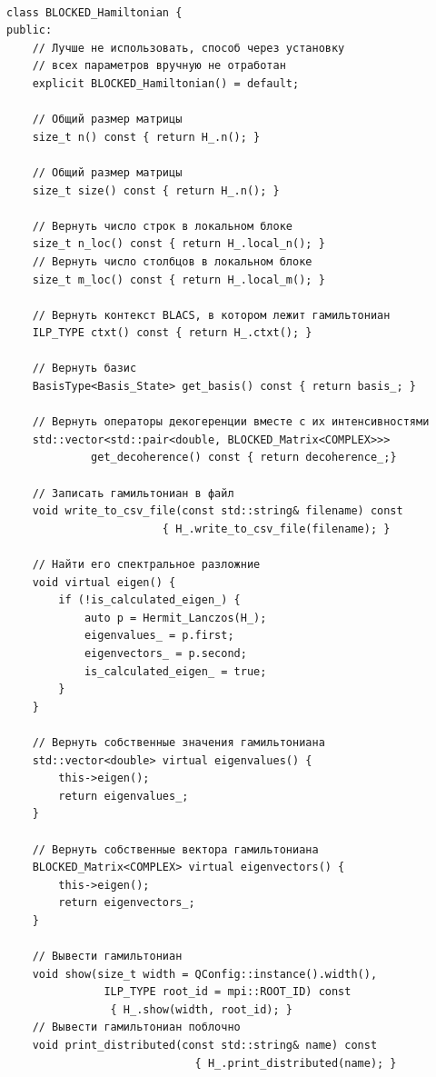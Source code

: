 \documentclass[12pt,fleqn]{article}
\begin{document}
\begin{mdframed}[linecolor=black, topline=true, bottomline=true,
    leftline=false, rightline=false]
\begin{verbatim}

class BLOCKED_Hamiltonian {
public:
    // Лучше не использовать, способ через установку
    // всех параметров вручную не отработан
    explicit BLOCKED_Hamiltonian() = default;

    // Общий размер матрицы
    size_t n() const { return H_.n(); }

    // Общий размер матрицы
    size_t size() const { return H_.n(); }

    // Вернуть число строк в локальном блоке
    size_t n_loc() const { return H_.local_n(); }
    // Вернуть число столбцов в локальном блоке
    size_t m_loc() const { return H_.local_m(); }

    // Вернуть контекст BLACS, в котором лежит гамильтониан
    ILP_TYPE ctxt() const { return H_.ctxt(); }

    // Вернуть базис
    BasisType<Basis_State> get_basis() const { return basis_; }

    // Вернуть операторы декогеренции вместе с их интенсивностями
    std::vector<std::pair<double, BLOCKED_Matrix<COMPLEX>>>
             get_decoherence() const { return decoherence_;}

    // Записать гамильтониан в файл
    void write_to_csv_file(const std::string& filename) const
                        { H_.write_to_csv_file(filename); }

    // Найти его спектральное разложние
    void virtual eigen() {
        if (!is_calculated_eigen_) {
            auto p = Hermit_Lanczos(H_);
            eigenvalues_ = p.first;
            eigenvectors_ = p.second;
            is_calculated_eigen_ = true;
        }
    }

    // Вернуть собственные значения гамильтониана
    std::vector<double> virtual eigenvalues() {
        this->eigen();
        return eigenvalues_;
    }

    // Вернуть собственные вектора гамильтониана
    BLOCKED_Matrix<COMPLEX> virtual eigenvectors() {
        this->eigen();
        return eigenvectors_;
    }

    // Вывести гамильтониан
    void show(size_t width = QConfig::instance().width(),
               ILP_TYPE root_id = mpi::ROOT_ID) const
                { H_.show(width, root_id); }
    // Вывести гамильтониан поблочно
    void print_distributed(const std::string& name) const
                             { H_.print_distributed(name); }


\end{verbatim}
\end{mdframed}
\end{document}
